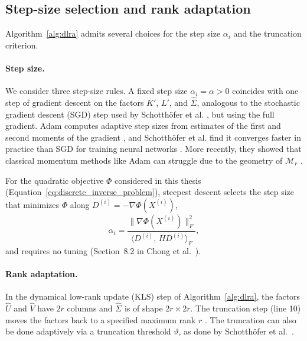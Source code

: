 \subsection{Step-size selection and rank adaptation}
Algorithm~\ref{alg:dlra} admits several choices for the step size $\alpha_i$ and the truncation criterion.

\paragraph{Step size.}
We consider three step-size rules. A fixed step size $\alpha_i = \alpha > 0$ coincides with one step of gradient descent on the factors $K'$, $L'$, and
$\hat \Sigma$, analogous to the stochastic gradient descent (SGD) step used by Schotthöfer et al. \cite{schotthoferLowrankLotteryTickets2022}, but using the full gradient. Adam computes adaptive step sizes from estimates of the first and second moments of the gradient \cite{kingmaAdamMethodStochastic2017}, and Schotthöfer et al. find it converges faster in practice than SGD for training neural networks \cite{schotthoferLowrankLotteryTickets2022}. More recently, they showed that classical momentum methods like Adam can struggle due to the geometry of $\mathcal{M}_r$ \cite{schotthoferGeometricFrameworkMomentumbased2025}.

For the quadratic objective $\Phi$ considered in this thesis (Equation~\eqref{eq:discrete_inverse_problem}), steepest descent selects the step size that minimizes $\Phi$ along $D^{(i)} = -\nabla \Phi(X^{(i)})$,
\begin{equation*}
    \alpha_i = \frac{\|\nabla\Phi(X^{(i)})\|_F^2}
                    {\langle D^{(i)},\, H D^{(i)} \rangle_F},
\end{equation*}
and requires no tuning (Section~8.2 in Chong et al.\ 
\cite{chong2023introduction}).

\paragraph{Rank adaptation.} In the dynamical low-rank update (KLS) step of Algorithm~\ref{alg:dlra}, the factors $\hat{U}$ and $\hat{V}$ have $2r$ columns and $\hat{\Sigma}$ is of shape $2r \times 2r$. The truncation step (line 10) moves the factors back to a specified maximum rank $r$ \cite{schotthoferLowrankLotteryTickets2022}. The truncation can also be done adaptively via a truncation threshold $\vartheta$, as done by Schotthöfer et al.\ \cite{schotthoferLowrankLotteryTickets2022}. 


